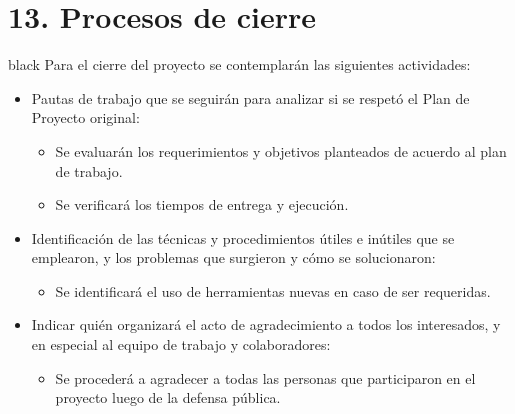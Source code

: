 \documentclass[
11pt, %
codirector, %
]{charter}
\begin{document}
\section{13. Procesos de cierre}    
\label{sec:cierre}

\begin{consigna}{black}
Para el cierre del proyecto se contemplarán las siguientes actividades:

\begin{itemize}
	\item Pautas de trabajo que se seguirán para analizar si se respetó el Plan de Proyecto original:
	\begin{itemize}
	    \item Se evaluarán los requerimientos y objetivos planteados de acuerdo al plan de trabajo.
	    \item Se verificará los tiempos de entrega y ejecución.
	\end{itemize}
	\item Identificación de las técnicas y procedimientos útiles e inútiles que se emplearon, y los problemas que surgieron y cómo se solucionaron:
	\begin{itemize}
	    \item Se identificará el uso de herramientas nuevas en caso de ser requeridas.
	\end{itemize}
	\item Indicar quién organizará el acto de agradecimiento a todos los interesados, y en especial al equipo de trabajo y colaboradores:
	  \begin{itemize}
	    \item Se procederá a agradecer a todas las personas que participaron en el proyecto luego
de la defensa pública.
	\end{itemize}
\end{itemize}

\end{consigna}
\end{document}

